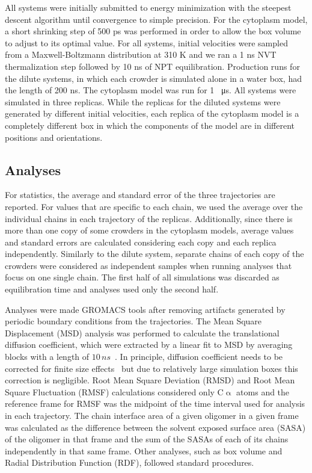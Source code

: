 \documentclass[journal=jacsat,manuscript=article]{achemso}
\begin{document}
All systems were initially submitted to energy minimization with the steepest descent algorithm until convergence to simple precision. For the cytoplasm model, a short shrinking step of 500 ps was performed in order to allow the box volume to adjust to its optimal value. For all systems, initial velocities were sampled from a Maxwell-Boltzmann distribution at 310 K and we ran a 1 ns NVT thermalization step followed by 10 ns of NPT equilibration. Production runs for the dilute systems, in which each crowder is simulated alone in a water box, had the length of 200 ns. The cytoplasm model was run for 1 \SI{}{\micro\second}. All systems were simulated in three replicas. While the replicas for the diluted systems were generated by different initial velocities, each replica of the cytoplasm model is a completely different box in which the components of the model are in different positions and orientations.

\subsection{Analyses}
For statistics, the average and standard error of the three trajectories are reported. For values that are specific to each chain, we used the average over the individual chains in each trajectory of the replicas. Additionally, since there is more than one copy of some crowders in the cytoplasm models, average values and standard errors are calculated considering each copy and each replica independently. Similarly to the dilute system, separate chains of each copy of the crowders were considered as independent samples when running analyses that focus on one single chain. The first half of all simulations was discarded as equilibration time and analyses used only the second half.

Analyses were made GROMACS tools after removing artifacts generated by periodic boundary conditions from the trajectories. The Mean Square Displacement (MSD) analysis was performed to calculate the translational diffusion coefficient, which were extracted by a linear fit to MSD by averaging blocks with a length of $10 \,ns$~\cite{Allen1987a}. In principle, diffusion coefficient needs to be corrected for finite size effects~\cite{Yeh2004} but due to relatively large simulation boxes this correction is negligible. Root Mean Square Deviation (RMSD) and Root Mean Square Fluctuation (RMSF) calculations considered only C$\upalpha$ atoms and the reference frame for RMSF was the midpoint of the time interval used for analysis in each trajectory. The chain interface area of a given oligomer in a given frame was calculated as the difference between the solvent exposed surface area (SASA) of the oligomer in that frame and the sum of the SASAs of each of its chains independently in that same frame. Other analyses, such as box volume and Radial Distribution Function (RDF), followed standard procedures.
\end{document}
